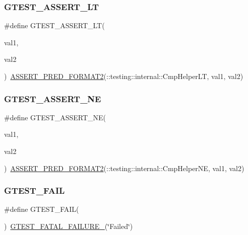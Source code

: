 \subsubsection{\texorpdfstring{GTEST\_ASSERT\_LT}{GTEST\_ASSERT\_LT}}
{\footnotesize\ttfamily \#define G\+T\+E\+S\+T\+\_\+\+A\+S\+S\+E\+R\+T\+\_\+\+LT(\begin{DoxyParamCaption}\item[{}]{val1,  }\item[{}]{val2 }\end{DoxyParamCaption})~\mbox{\hyperlink{_obj__test_2lib_2googletest-release-1_88_81_2googletest_2include_2gtest_2gtest__pred__impl_8h_ac452685a1a98ea3d96eb956a062ee210}{A\+S\+S\+E\+R\+T\+\_\+\+P\+R\+E\+D\+\_\+\+F\+O\+R\+M\+A\+T2}}(\+::testing\+::internal\+::\+Cmp\+Helper\+LT, val1, val2)}

\mbox{\label{googletest-master_2googletest_2include_2gtest_2gtest_8h_a6fa9bb2b6731eba8f481e40e9e4931b3}} 
\subsubsection{\texorpdfstring{GTEST\_ASSERT\_NE}{GTEST\_ASSERT\_NE}}
{\footnotesize\ttfamily \#define G\+T\+E\+S\+T\+\_\+\+A\+S\+S\+E\+R\+T\+\_\+\+NE(\begin{DoxyParamCaption}\item[{}]{val1,  }\item[{}]{val2 }\end{DoxyParamCaption})~\mbox{\hyperlink{_obj__test_2lib_2googletest-release-1_88_81_2googletest_2include_2gtest_2gtest__pred__impl_8h_ac452685a1a98ea3d96eb956a062ee210}{A\+S\+S\+E\+R\+T\+\_\+\+P\+R\+E\+D\+\_\+\+F\+O\+R\+M\+A\+T2}}(\+::testing\+::internal\+::\+Cmp\+Helper\+NE, val1, val2)}

\mbox{\label{googletest-master_2googletest_2include_2gtest_2gtest_8h_a636231436707c30d6778f79ae96f5dc6}} 
\subsubsection{\texorpdfstring{GTEST\_FAIL}{GTEST\_FAIL}}
{\footnotesize\ttfamily \#define G\+T\+E\+S\+T\+\_\+\+F\+A\+IL(\begin{DoxyParamCaption}{ }\end{DoxyParamCaption})~\mbox{\hyperlink{_obj__test_2lib_2googletest-release-1_88_81_2googletest_2include_2gtest_2internal_2gtest-internal_8h_a0f9a4c3ea82cc7bf4478eaffdc168358}{G\+T\+E\+S\+T\+\_\+\+F\+A\+T\+A\+L\+\_\+\+F\+A\+I\+L\+U\+R\+E\+\_\+}}(\char`\"{}Failed\char`\"{})}

